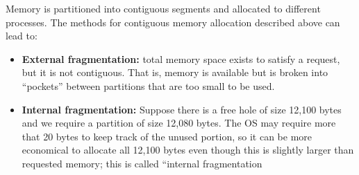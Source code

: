 \documentclass[a4paper, 10pt]{article}
\begin{document}
Memory is partitioned into contiguous segments and allocated to different processes. The methods for contiguous memory allocation described above can lead to:
\begin{itemize}
    \item \textbf{External fragmentation:} total memory space exists to satisfy a request, but it is not contiguous. That is, memory is available but is broken into “pockets” between partitions that are too small to be used.
    \item \textbf{Internal fragmentation:} Suppose there is a free hole of size 12,100
          bytes and we require a partition of size 12,080 bytes. The OS may require more that 20 bytes to keep track of the unused portion, so it can be more economical to allocate all 12,100 bytes even though this is slightly larger than requested memory; this is called “internal fragmentation
\end{itemize}
\end{document}
